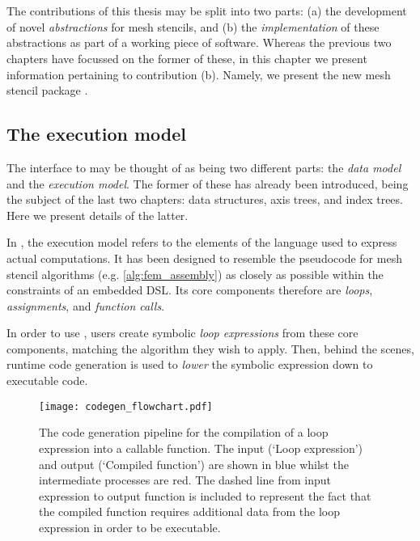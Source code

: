 \documentclass[thesis]{subfiles}
\begin{document}

\chapter{}
\label{chapter:pyop3}

The contributions of this thesis may be split into two parts:
(a) the development of novel \emph{abstractions} for mesh stencils, and
(b) the \emph{implementation} of these abstractions as part of a working piece of software.
Whereas the previous two chapters have focussed on the former of these, in this chapter we present information pertaining to contribution (b).
Namely, we present the new mesh stencil package .

\section{The execution model}

The interface to  may be thought of as being two different parts: the \emph{data model} and the \emph{execution model}.
The former of these has already been introduced, being the subject of the last two chapters: data structures, axis trees, and index trees.
Here we present details of the latter.

In , the execution model refers to the elements of the language used to express actual computations.
It has been designed to resemble the pseudocode for mesh stencil algorithms (e.g. \cref{alg:fem_assembly}) as closely as possible within the constraints of an embedded DSL.
Its core components therefore are \emph{loops}, \emph{assignments}, and \emph{function calls}.



In order to use , users create symbolic \emph{loop expressions} from these core components, matching the algorithm they wish to apply.
Then, behind the scenes, runtime code generation is used to \emph{lower} the symbolic expression down to executable code.

\begin{figure}
  \centering
  \texttt{[image: codegen\_flowchart.pdf]}
  \caption{
    The code generation pipeline for the compilation of a loop expression into a callable function.
    The input (`Loop expression') and output (`Compiled function') are shown in blue whilst the intermediate processes are red.
    The dashed line from input expression to output function is included to represent the fact that the compiled function requires additional data from the loop expression in order to be executable.
  }
  \label{fig:codegen_flowchart}
\end{figure}
\end{document}
